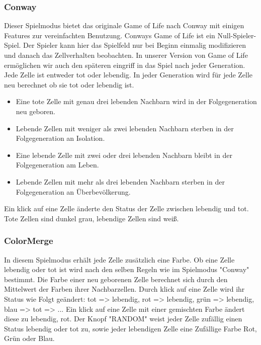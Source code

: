 \documentclass[12pt]{article}
\theoremstyle{plain}
\begin{document}
\subsubsection{Conway}
Dieser Spielmodus bietet das originale Game of Life nach Conway mit einigen Features zur vereinfachten Benutzung. Conways Game of Life ist ein Null-Spieler-Spiel. Der Spieler kann hier das Spielfeld nur bei Beginn einmalig modifizieren und danach das Zellverhalten beobachten. In unserer Version von Game of Life ermöglichen wir auch den späteren eingriff in das Spiel nach jeder Generation. Jede Zelle ist entweder tot oder lebendig. In jeder Generation wird für jede Zelle neu berechnet ob sie tot oder lebendig ist.
\begin{itemize}
\item Eine tote Zelle mit genau drei lebenden Nachbarn wird in der Folgegeneration neu geboren.
\item Lebende Zellen mit weniger als zwei lebenden Nachbarn sterben in der Folgegeneration an Isolation.
\item Eine lebende Zelle mit zwei oder drei lebenden Nachbarn bleibt in der Folgegeneration am Leben.
\item Lebende Zellen mit mehr als drei lebenden Nachbarn sterben in der Folgegeneration an Überbevölkerung.
\end{itemize}
Ein klick auf eine Zelle änderte den Status der Zelle zwischen lebendig und tot. Tote Zellen sind dunkel grau, lebendige Zellen sind weiß.

\subsubsection{ColorMerge}
In diesem Spielmodus erhält jede Zelle zusätzlich eine Farbe. Ob eine Zelle lebendig oder tot ist wird nach den selben Regeln wie im Spielmodus "Conway" bestimmt. Die Farbe einer neu geborenen Zelle berechnet sich durch den Mittelwert der Farben ihrer Nachbarzellen. Durch klick auf eine Zelle wird ihr Status wie Folgt geändert:
\newline
tot => lebendig, rot => lebendig, grün => lebendig, blau => tot => ...
\newline
Ein klick auf eine Zelle mit einer gemischten Farbe ändert diese zu lebendig, rot. Der Knopf "RANDOM" weist jeder Zelle zufällig einen Status lebendig oder tot zu, sowie jeder lebendigen Zelle eine Zufällige Farbe Rot, Grün oder Blau.
\end{document}
